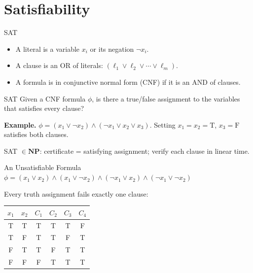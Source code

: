 \documentclass[10pt,aspectratio=169]{beamer}
\begin{document}
\section{Satisfiability}

\begin{frame}{SAT}
  \begin{itemize}
    \item A \alert{literal} is a variable $x_i$ or its negation $\neg x_i$.
    \item A \alert{clause} is an OR of literals:
          $(\ell_1 \lor \ell_2 \lor \cdots \lor \ell_m)$.
    \item A formula is in \alert{conjunctive normal form} (CNF) if it is an
          AND of clauses.
  \end{itemize}

  \pause

  \begin{block}{SAT}
    Given a CNF formula $\phi$, is there a true/false assignment to the
    variables that satisfies every clause?
  \end{block}

  \textbf{Example.}
  $\phi = (x_1 \lor \neg x_2) \land (\neg x_1 \lor x_2 \lor x_3)$.
  \pause
  Setting $x_1 = x_2 = \mathrm{T}$, $x_3 = \mathrm{F}$ satisfies both clauses.

  \pause
  \medskip
  SAT $\in \mathbf{NP}$: certificate = satisfying assignment;
  verify each clause in linear time.
\end{frame}

\begin{frame}{An Unsatisfiable Formula}
  $\phi = (x_1 \lor x_2) \land (x_1 \lor \neg x_2) \land
          (\neg x_1 \lor x_2) \land (\neg x_1 \lor \neg x_2)$

  \bigskip
  Every truth assignment fails exactly one clause:

  \medskip
  \begin{center}
  \begin{tabular}{cc|cccc}
    \toprule
    $x_1$ & $x_2$ & $C_1$ & $C_2$ & $C_3$ & $C_4$ \\
    \midrule
    T & T & T & T & T & \alert{F} \\
    T & F & T & T & \alert{F} & T \\
    F & T & T & \alert{F} & T & T \\
    F & F & \alert{F} & T & T & T \\
    \bottomrule
  \end{tabular}
  \end{center}


\end{frame}
\end{document}
